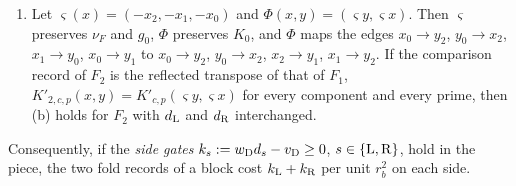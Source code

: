 \begin{lemma}
\begin{enumerate}[label=(\alph*)]
 $\bar H_X=(1-n_Xe_0(X))^{-1}$ if $n_Xe_0(X)<1$; and $D^1_\Blk$ is the diagonal
 copy at $\iota$ of the product law $\nu_F^{\otimes\Blk}$ placed by $F_1$, the
 normalized one-layer companion of $F_1$ in $\widetilde\mu_\Blk$.
\item Let $\varsigma(x)=(-x_2,-x_1,-x_0)$ and $\Phi(x,y)=(\varsigma
 y,\varsigma x)$. Then $\varsigma$ preserves $\nu_F$ and $g_0$, $\Phi$
 preserves $K_0$, and $\Phi$ maps the edges $x_0\to y_2$,
 $y_0\to x_2$, $x_1\to y_0$, $x_0\to y_1$ to $x_0\to y_2$, $y_0\to x_2$,
 $x_2\to y_1$, $x_1\to y_2$. If the comparison record of $F_2$ is the
 reflected transpose of that of $F_1$, $K'_{2,c,p}(x,y)=K'_{c,p}(\varsigma
 y,\varsigma x)$ for every component and every prime, then (b) holds for
 $F_2$ with $d_{\rm L}$ and $d_{\rm R}$ interchanged.
\end{enumerate}
Consequently, if the \emph{side gates} $k_s:=w_{\rm D}d_s-v_{\rm D}\ge0$,
$s\in\{{\rm L},{\rm R}\}$, hold in the piece, the two fold records of a block
cost $k_{\rm L}+k_{\rm R}$ per unit $r_b^2$ on each side.
\end{lemma}

